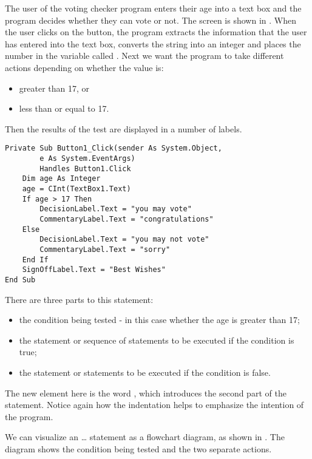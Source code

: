 			The user of the voting checker program enters their age into a text box and the program decides whether they can vote or not. The screen is shown in . When the user clicks on the button, the program extracts the information that the user has entered into the text box, converts the string into an integer and places the number in the variable called . Next we want the program to take different actions depending on whether the value is:
			\begin{itemize}
				\item greater than 17, or
				\item less than or equal to 17.
			\end{itemize}
			Then the results of the test are displayed in a number of labels.
			\begin{lstlisting}
Private Sub Button1_Click(sender As System.Object,
		e As System.EventArgs)
		Handles Button1.Click
	Dim age As Integer
	age = CInt(TextBox1.Text)
	If age > 17 Then
		DecisionLabel.Text = "you may vote"
		CommentaryLabel.Text = "congratulations"
	Else
		DecisionLabel.Text = "you may not vote"
		CommentaryLabel.Text = "sorry"
	End If
	SignOffLabel.Text = "Best Wishes"
End Sub
			\end{lstlisting}
			There are three parts to this  statement:
			\begin{itemize}
				\item the condition being tested - in this case whether the age is greater than 17;
				\item the statement or sequence of statements to be executed if the condition is true;
				\item the statement or statements to be executed if the condition is false.
			\end{itemize}
			The new element here is the word , which introduces the second part of the  statement. Notice again how the indentation helps to emphasize the intention of the program.
			
			We can visualize an … statement as a flowchart diagram, as shown in . The diagram shows the condition being tested and the two separate actions.

